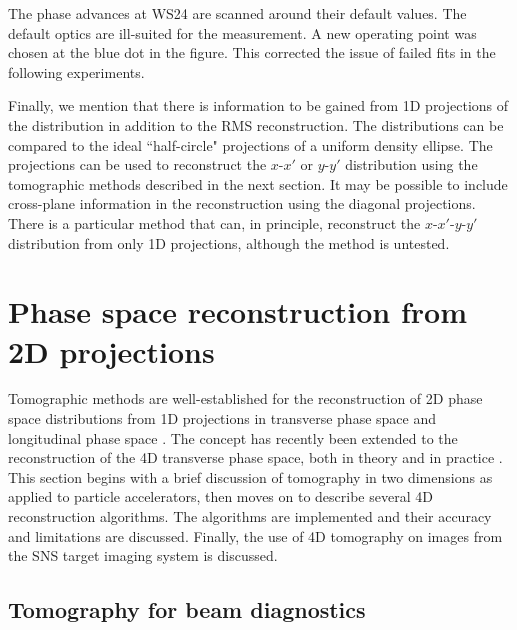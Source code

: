 %
The phase advances at WS24 are scanned around their default values. The default optics are ill-suited for the measurement. A new operating point was chosen at the blue dot in the figure. This corrected the issue of failed fits in the following experiments. 

Finally, we mention that there is information to be gained from 1D projections of the distribution in addition to the RMS reconstruction. The distributions can be compared to the ideal ``half-circle" projections of a uniform density ellipse. The projections can be used to reconstruct the $x$-$x'$ or $y$-$y'$ distribution using the tomographic methods described in the next section. It may be possible to include cross-plane information in the reconstruction using the diagonal projections. There is a particular method that can, in principle, reconstruct the $x$-$x'$-$y$-$y'$ distribution from only 1D projections, although the method is untested. 






\section{Phase space reconstruction from 2D projections}

Tomographic methods are well-established for the reconstruction of 2D phase space distributions from 1D projections in transverse phase space \cite{Hock2014} and longitudinal phase space \cite{Evans2014}. The concept has recently been extended to the reconstruction of the 4D transverse phase space, both in theory and in practice \cite{Hock2013b, Wang2019, Wolski2020}. This section begins with a brief discussion of tomography in two dimensions as applied to particle accelerators, then moves on to describe several 4D reconstruction algorithms. The algorithms are implemented and their accuracy and limitations are discussed. Finally, the use of 4D tomography on images from the SNS target imaging system is discussed.


\subsection{Tomography for beam diagnostics}

